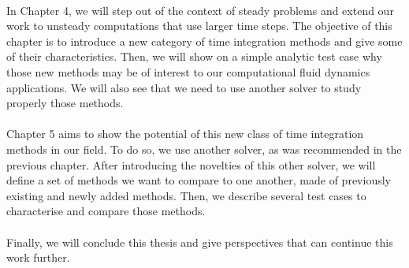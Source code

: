     \paragraph{}
    In Chapter 4, we will step out of the context of steady problems and extend our work to unsteady computations that use larger time steps.
    The objective of this chapter is to introduce a new category of time integration methods and give some of their characteristics.
    Then, we will show on a simple analytic test case why those new methods may be of interest to our computational fluid dynamics applications.
    We will also see that we need to use another solver to study properly those methods.

    \paragraph{}
    Chapter 5 aims to show the potential of this new class of time integration methods in our field.
    To do so, we use another solver, as was recommended in the previous chapter.
    After introducing the novelties of this other solver, we will define a set of methods we want to compare to one another, made of previously existing and newly added methods.
    Then, we describe several test cases to characterise and compare those methods.

    \paragraph{}
    Finally, we will conclude this thesis and give perspectives that can continue this work further.
